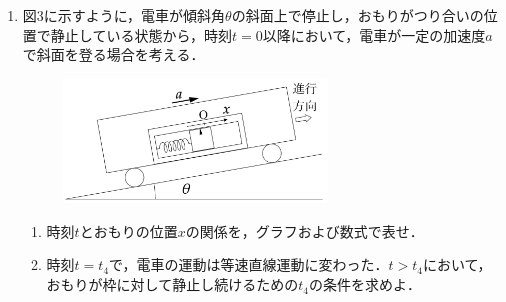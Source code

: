 \begin{enumerate}[I]
  \item {\hzw}図3に示すように，電車が傾斜角$\theta$の斜面上で停止し，おもりがつり合いの位置で静止している状態から，時刻$t = 0$以降において，電車が一定の加速度$a$で斜面を登る場合を考える．
  \begin{figure}[H]
    \centering
    \includegraphics[width=7cm]{fig/fig_1_7_3.pdf}
    \caption{}
  \end{figure}
  \begin{enumerate}[resume, label=\textbf{問\arabic*}]
    \item {\hzw}時刻$t$とおもりの位置$x$の関係を，グラフおよび数式で表せ．
    \item {\hzw}時刻$t = t_4$で，電車の運動は等速直線運動に変わった．$t > t_4$において，おもりが枠に対して静止し続けるための$t_4$の条件を求めよ．
  \end{enumerate}
\end{enumerate}

